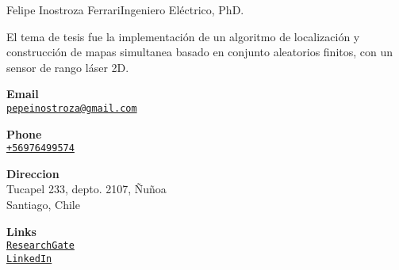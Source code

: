 \documentclass{article}
\begin{document}
\begin{cv}[avatar]{Felipe Inostroza Ferrari}{Ingeniero Eléctrico, PhD.}
\begin{cvevent}[2012][2014]
El tema de tesis fue la implementación de un algoritmo de localización y construcción de  mapas simultanea basado en conjunto aleatorios finitos, con un sensor de rango láser 2D. 
\end{cvevent}
\begin{cvevent}[2007][2014]
\end{cvevent}
\begin{cvevent}[2007][2014]
\end{cvevent}


% 
%




\cvsidebar %



\begin{cvitem}[Envelope][4]
    \textbf{Email}\\
    \href{mailto:pepeinostroza@gmail.com}{\texttt{pepeinostroza@gmail.com}}
\end{cvitem}

\cvseparator[3]
\begin{cvitem}[Phone][4]
    \textbf{Phone}\\
    \href{tel:+56976499574}{\texttt{+56976499574}}
\end{cvitem}

\cvseparator[3]
\begin{cvitem}[Home][4]
    \textbf{Direccion}\\
    Tucapel 233, depto. 2107, Ñuñoa\\ Santiago, Chile
\end{cvitem}

\cvseparator[3]
\begin{cvitem}[Globe][4]
    \textbf{Links}\\
    \href{https://www.researchgate.net/profile/Felipe-Inostroza-4}{\texttt{ResearchGate}} \\
    \href{https://www.linkedin.com/in/felipe-inostroza-ferrari-a0852035/}{\texttt{LinkedIn}}
\end{cvitem}



\end{cv}
\end{document}
